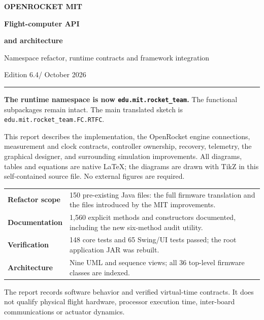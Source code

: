 \documentclass[10pt,letterpaper]{article}
\newcommand{\code}[1]{\nolinkurl{#1}}
\begin{document}
\begin{titlepage}
\color{ink}
{\sffamily\bfseries\Large OPENROCKET MIT\par}
\vspace{1.25cm}
{\sffamily\bfseries\Huge Flight-computer API\par}
\vspace{0.2cm}
{\sffamily\bfseries\Huge and architecture\par}
\vspace{0.55cm}
{\Large Namespace refactor, runtime contracts and framework integration\par}
\vspace{0.7cm}
{\large Edition 6.4\quad / October 2026\par}
\vspace{0.8cm}
\hrule height 1pt
\vspace{0.5cm}
\textbf{The runtime namespace is now \code{edu.mit.rocket_team}.}
The functional subpackages remain intact. The main translated sketch is
\code{edu.mit.rocket_team.FC.RTFC}.

This report describes the implementation, the OpenRocket engine connections,
measurement and clock contracts, controller ownership, recovery, telemetry,
the graphical designer, and surrounding simulation improvements.
All diagrams, tables and equations are native LaTeX; the diagrams are drawn
with TikZ in this self-contained source file. No external figures are required.
\par
\vspace{0.65cm}
\begin{tabularx}{\linewidth}{@{}>{\bfseries}p{3.4cm}Y@{}}
\toprule
Refactor scope & 150 pre-existing Java files: the full firmware translation and the files introduced by the MIT improvements.\\
Documentation & 1,560 explicit methods and constructors documented, including the new six-method audit utility.\\
Verification & 148 core tests and 65 Swing/UI tests passed; the root application JAR was rebuilt.\\
Architecture & Nine UML and sequence views; all 36 top-level firmware classes are indexed.\\
\bottomrule
\end{tabularx}
\vfill
{\small\color{muted}The report records software behavior and verified virtual-time contracts.
It does not qualify physical flight hardware, processor execution time,
inter-board communications or actuator dynamics.}\par
\end{titlepage}
\setcounter{tocdepth}{1}
{\small\setlength{\parskip}{0pt}
\tableofcontents
\vspace{0.15cm}
\listoffigures
}
\clearpage
\end{document}
